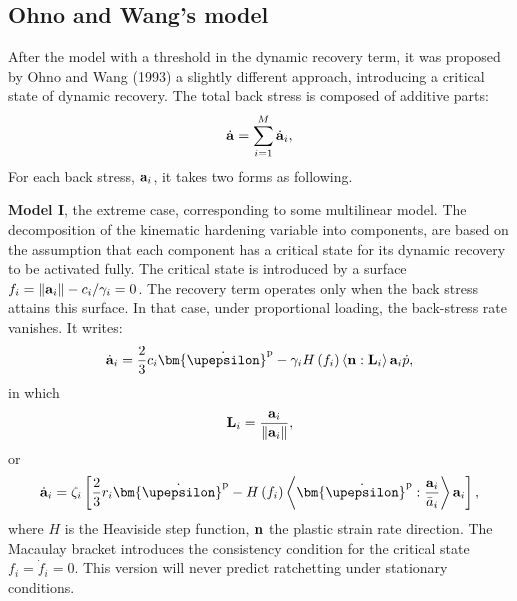 \subsection{Ohno and Wang's model}
\noindent
After the model with a threshold in the dynamic recovery term, it was proposed by Ohno and Wang (1993) \cite{ohno1993kinematic} a slightly different approach, introducing a critical state of dynamic recovery.
The total back stress is composed of additive parts:
\begin{equation}
{\dot{\bf a}} = \sum\limits_{i = 1}^M {{{{\dot{\bf a}}}_i}},
\end{equation}
For each back stress, ${\bf{a}}_i$, it takes two forms as following.

\textbf{Model I}, the extreme case, corresponding to some multilinear model.
The decomposition of the kinematic hardening variable into components, are based on the assumption that each component has a critical state for its dynamic recovery to be activated fully.
The critical state is introduced by a surface ${f_i} = \left\| {{{\bf{a}}_i}} \right\| - {c_i}/{\gamma _i} = 0$.
The recovery term operates only when the back stress attains this surface.
In that case, under proportional loading, the back-stress rate vanishes. It writes:
\begin{equation}
{{\dot{\bf a}}_i} = \frac{2}{3}{c_i}{{\bm{\dot \upepsilon }}^{\rm{p}}} - {\gamma _i}H\left( {{f_i}} \right)\left\langle {{\bf{n}}:{{\bf{L}}_i}} \right\rangle {{\bf{a}}_i}\dot p,
\end{equation}
in which
\begin{equation}
{{\bf{L}}_i} = \frac{{{{\bf{a}}_i}}}{{\left\| {{{\bf{a}}_i}} \right\|}},
\end{equation}
or
\begin{equation}
{{\dot{\bf a}}_i} = {\zeta _i}\left[ {\frac{2}{3}{r_i}{{{\bm{\dot \upepsilon }}}^{\rm{p}}} - H\left( {{f_i}} \right)\left\langle {{{{\bm{\dot \upepsilon }}}^{\rm{p}}}:\frac{{{{\bf{a}}_i}}}{{{{\bar a}_i}}}} \right\rangle {{\bf{a}}_i}} \right],
\label{Eqn:Introduction2}
\end{equation}
where $H$ is the Heaviside step function, ${\bf{n}}$ the plastic strain rate direction.
The Macaulay bracket introduces the consistency condition for the critical state ${f_i} = {\dot f_i} = 0$.
This version will never predict ratchetting under stationary conditions.

